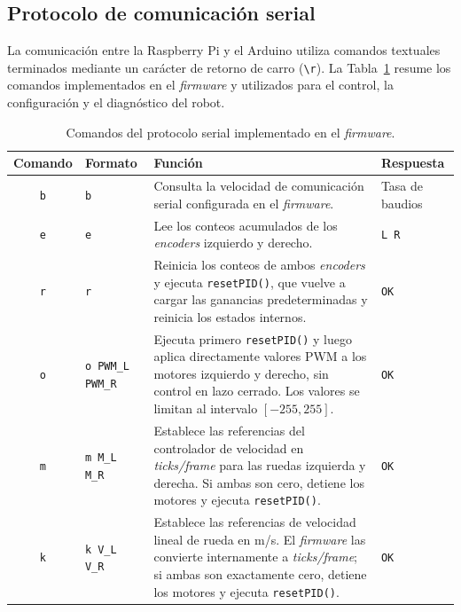 \begin{appendices}
\subsection{Protocolo de comunicación serial}
\label{anx:protocolo_serial}

La comunicación entre la Raspberry Pi y el \gls{Arduino} utiliza comandos textuales terminados mediante un carácter de retorno de carro (\texttt{\textbackslash r}). La Tabla~\ref{tab:protocolo_serial} resume los comandos implementados en el \textit{firmware} y utilizados para el control, la configuración y el diagnóstico del robot.

\begin{table}[H]
\centering
\caption{Comandos del protocolo serial implementado en el \textit{firmware}.}
\label{tab:protocolo_serial}
\small
\begin{tabular}{c p{2.7cm} p{6.8cm} p{2.2cm}}
\toprule
\textbf{Comando} &
\textbf{Formato} &
\textbf{Función} &
\textbf{Respuesta} \\
\midrule

\texttt{b} &
\texttt{b} &
Consulta la velocidad de comunicación serial configurada en el \textit{firmware}. &
Tasa de baudios \\

\texttt{e} &
\texttt{e} &
Lee los conteos acumulados de los \textit{encoders} izquierdo y derecho. &
\texttt{L R} \\

\texttt{r} &
\texttt{r} &
Reinicia los conteos de ambos \textit{encoders} y ejecuta \texttt{resetPID()}, que vuelve a cargar las ganancias predeterminadas y reinicia los estados internos. &
\texttt{OK} \\

\texttt{o} &
\texttt{o PWM\_L PWM\_R} &
Ejecuta primero \texttt{resetPID()} y luego aplica directamente valores PWM a los motores izquierdo y derecho, sin control en lazo cerrado. Los valores se limitan al intervalo $[-255,255]$. &
\texttt{OK} \\

\texttt{m} &
\texttt{m M\_L M\_R} &
Establece las referencias del controlador de velocidad en \textit{ticks/frame} para las ruedas izquierda y derecha. Si ambas son cero, detiene los motores y ejecuta \texttt{resetPID()}. &
\texttt{OK} \\

\texttt{k} &
\texttt{k V\_L V\_R} &
Establece las referencias de velocidad lineal de rueda en m/s. El \textit{firmware} las convierte internamente a \textit{ticks/frame}; si ambas son exactamente cero, detiene los motores y ejecuta \texttt{resetPID()}. &
\texttt{OK} \\


\end{tabular}
\end{table}
\end{appendices}
